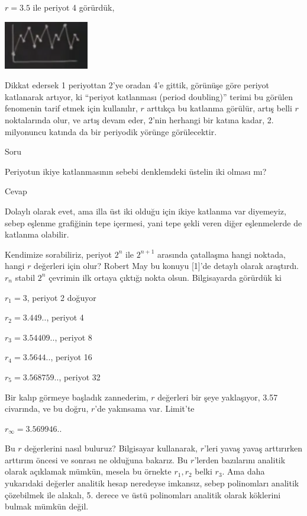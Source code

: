 \documentclass[12pt,fleqn]{article}\usepackage{../../common}
\begin{document}
$r=3.5$ ile periyot 4 görürdük, 

\includegraphics[width=10em]{19_05.png}

Dikkat edersek 1 periyottan 2'ye oradan 4'e gittik, görünüşe göre periyot
katlanarak artıyor, ki ``periyot katlanması (period doubling)'' terimi bu
görülen fenomenin tarif etmek için kullanılır, $r$ arttıkça bu katlanma
görülür, artış belli $r$ noktalarında olur, ve artış devam eder, 2'nin
herhangi bir katına kadar, 2. milyonuncu katında da bir periyodik yörünge
görülecektir. 

Soru

Periyotun ikiye katlanmasının sebebi denklemdeki üstelin iki olması mı? 

Cevap

Dolaylı olarak evet, ama illa üst iki olduğu için ikiye katlanma var
diyemeyiz, sebep eşlenme grafiğinin tepe içermesi, yani tepe şekli veren
diğer eşlenmelerde de katlanma olabilir.

Kendimize sorabiliriz, periyot $2^n$ ile $2^{n+1}$ arasında çatallaşma
hangi noktada, hangi $r$ değerleri için olur? Robert May bu konuyu [1]'de
detaylı olarak araştırdı. $r_n$ stabil $2^n$ çevrimin ilk ortaya çıktığı
nokta olsun. Bilgisayarda görürdük ki

$r_1 = 3$, periyot 2 doğuyor

$r_2 = 3.449..$, periyot 4

$r_3 = 3.54409..$, periyot 8

$r_4 = 3.5644..$, periyot 16

$r_5 = 3.568759..$, periyot 32

Bir kalıp görmeye başladık zannederim, $r$ değerleri bir şeye yaklaşıyor,
3.57 civarında, ve bu doğru, $r$'de yakınsama var. Limit'te 

$r_\infty = 3.569946..$

Bu $r$ değerlerini nasıl buluruz? Bilgisayar kullanarak, $r$'leri yavaş
yavaş arttırırken arttırım öncesi ve sonrası ne olduğuna bakarız. Bu
$r$'lerden bazılarını analitik olarak açıklamak mümkün, mesela bu örnekte
$r_1,r_2$ belki $r_3$. Ama daha yukarıdaki değerler analitik hesap
neredeyse imkansız, sebep polinomları analitik çözebilmek ile alakalı,
5. derece ve üstü polinomları analitik olarak köklerini bulmak mümkün
değil.
\end{document}
